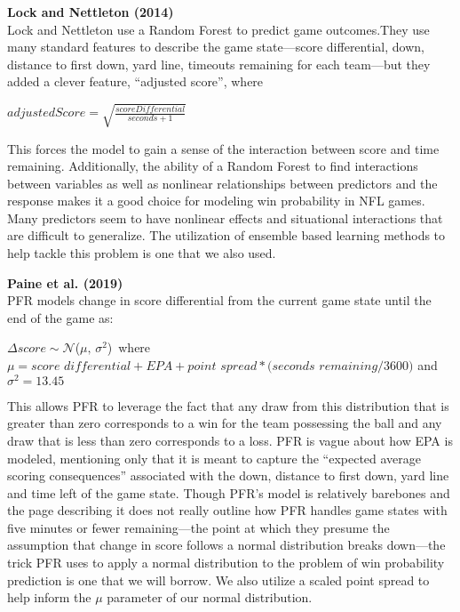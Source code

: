 \documentclass[12pt,twoside]{dukestatscithesis}
\begin{document}
\textbf{Lock and Nettleton (2014)}\\
Lock and Nettleton use a Random Forest to predict game outcomes.They use many standard features to describe the game state---score differential, down, distance to first down, yard line, timeouts remaining for each team---but they added a clever feature, ``adjusted score'', where

\(adjustedScore = \sqrt{\frac{scoreDifferential}{seconds+1}}\)

This forces the model to gain a sense of the interaction between score and time remaining. Additionally, the ability of a Random Forest to find interactions between variables as well as nonlinear relationships between predictors and the response makes it a good choice for modeling win probability in NFL games. Many predictors seem to have nonlinear effects and situational interactions that are difficult to generalize. The utilization of ensemble based learning methods to help tackle this problem is one that we also used.

\textbf{Paine et al. (2019)}\\
PFR models change in score differential from the current game state until the end of the game as:

\(\Delta score \sim \mathcal{N}\)(\(\mu,\,\sigma^{2}\))~where\\
\(\mu = score\) \(differential + EPA + point\) \(spread * (seconds\) \(remaining/3600)\) and\\
\(\sigma^{2} = 13.45\)

This allows PFR to leverage the fact that any draw from this distribution that is greater than zero corresponds to a win for the team possessing the ball and any draw that is less than zero corresponds to a loss. PFR is vague about how EPA is modeled, mentioning only that it is meant to capture the ``expected average scoring consequences'' associated with the down, distance to first down, yard line and time left of the game state. Though PFR's model is relatively barebones and the page describing it does not really outline how PFR handles game states with five minutes or fewer remaining---the point at which they presume the assumption that change in score follows a normal distribution breaks down---the trick PFR uses to apply a normal distribution to the problem of win probability prediction is one that we will borrow. We also utilize a scaled point spread to help inform the \(\mu\) parameter of our normal distribution.
\end{document}
